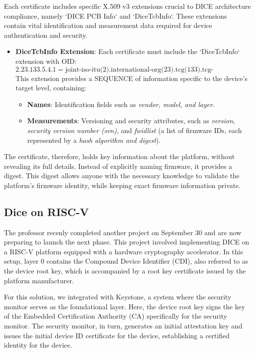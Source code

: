 Each certificate includes specific X.509 v3 extensions crucial to DICE
architecture compliance, namely `DICE PCB Info` and `DiceTcbInfo`.
These extensions contain vital identification and measurement data
required for device authentication and security.

\begin{itemize}
    \item \textbf{DiceTcbInfo Extension}: Each certificate must
      include the `DiceTcbInfo` extension with OID:
    \[
    2.23.133.5.4.1 =
    \text{joint-iso-itu(2).international-org(23).tcg(133).tcg-platformClass(5).dice(4).TcbInfo(1)}
    \]
    This extension provides a SEQUENCE of information specific to the
    device’s target level, containing:
    \begin{itemize}
        \item \textbf{Names}: Identification fields such as
          \textit{vendor, model, and layer}.
        \item \textbf{Measurements}: Versioning and security
          attributes, such as \textit{version, security version number
          (svn)}, and \textit{fwidlist} (a list of firmware IDs, each
          represented by a \textit{hash algorithm and digest}).
    \end{itemize}
    
\end{itemize}


The certificate, therefore, holds key information about the platform,
without revealing its full details. Instead of explicitly naming
firmware, it provides a digest. This digest allows anyone with the
necessary knowledge to validate the platform’s firmware identity,
while keeping exact firmware information private.
\subsection{Dice on RISC-V}
The professor recenly completed another project on September 30 and
are now preparing to launch the next phase. This project involved
implementing DICE on a RISC-V platform equipped with a hardware
cryptography accelerator. In this setup, layer 0 contains the Compound
Device Identifier (CDI), also referred to as the device root key,
which is accompanied by a root key certificate issued by the platform
manufacturer.

For this solution, we integrated with Keystone, a system where the
security monitor serves as the foundational layer. Here, the device
root key signs the key of the Embedded Certification Authority (CA)
specifically for the security monitor. The security monitor, in turn,
generates an initial attestation key and issues the initial device ID
certificate for the device, establishing a certified identity for the
device.

